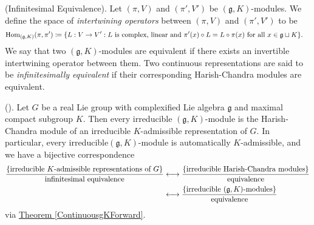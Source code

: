 \noindent\begin{definition}\textup{(Infinitesimal Equivalence).} Let $(\pi, V)$ and $(\pi', V')$ be $(\mathfrak{g}, K)$-modules. We define the space of {\em intertwining operators} between $(\pi, V)$ and $(\pi', V')$ to be
\begin{align*}
\begin{split}
\homset_{(\mathfrak{g}, K)}(\pi, \pi') %
&\coloneqq \{L : V \to V' : \textup{$L$ is complex, linear and $\pi'(x) \circ L = L \circ \pi(x)$ for all $x \in \mathfrak{g} \sqcup K$}\}.
\end{split}
\end{align*}
We say that two $(\mathfrak{g}, K)$-modules are equivalent if there exists an invertible intertwining operator between them. Two continuous representations are said to be {\em infinitesimally equivalent} if their corresponding Harish-Chandra modules are equivalent.\newpage
\end{definition}


\noindent\begin{theorem}\textup{(\cite[Theorem 0.3.10]{Vog81}).} Let $G$ be a real Lie group with complexified Lie algebra $\mathfrak{g}$ and maximal compact subgroup $K$. Then every irreducible $(\mathfrak{g}, K)$-module is the Harish-Chandra module of an irreducible $K$-admissible representation of $G$. In particular, every irreducible\linebreak $(\mathfrak{g}, K)$-module is automatically $K$-admissible, and we have a bijective correspondence
\begin{align*}
\begin{split}
\frac{\{\textup{irreducible $K$-admissible representations of $G$}\}}{\textup{infinitesimal equivalence}} &\longleftrightarrow \frac{\{\textup{irreducible Harish-Chandra modules}\}}{\textup{equivalence}}\\
&\longleftrightarrow \frac{\{\textup{irreducible $(\mathfrak{g}, K)$-modules}\}}{\textup{equivalence}}
\end{split}
\end{align*}
\noindent via \hyperref[ContinuousgKForward]{Theorem \ref*{ContinuousgKForward}}.\\
\end{theorem}

